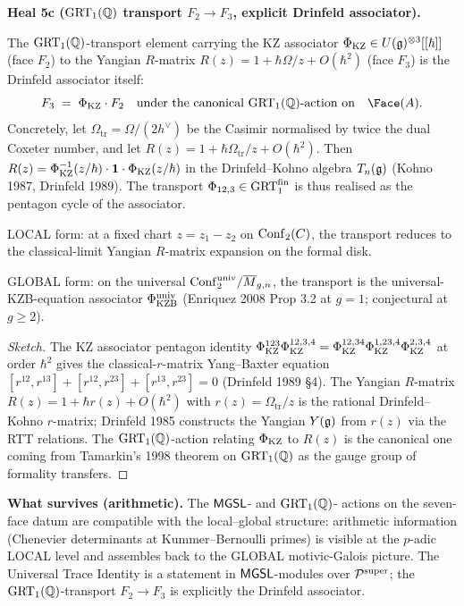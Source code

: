 \textbf{Heal 5c ($\mathrm{GRT}_1(\mathbb{Q})$ transport $F_2 \to F_3$, explicit
Drinfeld associator).}

\begin{proposition}\ClaimStatusTheorem
\label{prop:F2-F3-drinfeld-associator}
The $\mathrm{GRT}_1(\mathbb{Q})$-transport element carrying the KZ associator $\Phi_{\mathrm{KZ}}
\in U(\mathfrak{g})^{\otimes 3}[[\hbar]]$ (face $F_2$) to the Yangian
$R$-matrix $R(z) = 1 + \hbar \Omega/z + O(\hbar^2)$ (face $F_3$) is
the Drinfeld associator itself:
\[
  F_3 \;=\; \Phi_{\KZ} \cdot F_2
  \quad\text{under the canonical $\GRT(\QQ)$-action on}\quad
  \Face(A).
\]
Concretely, let $\Omega_{\mathrm{tr}} = \Omega / (2 h^\vee)$ be the
Casimir normalised by twice the dual Coxeter number, and let
$R(z) = 1 + \hbar \Omega_{\mathrm{tr}}/z + O(\hbar^2)$. Then
$R(z) = \Phi_{\mathrm{KZ}}^{-1}(z/\hbar) \cdot \mathbf{1} \cdot \Phi_{\mathrm{KZ}}(z/\hbar)$
in the Drinfeld--Kohno algebra $T_n(\mathfrak{g})$ (Kohno 1987, Drinfeld
1989). The transport $\Phi_{12,3} \in \mathrm{GRT}_1^{\mathrm{fin}}$ is thus
realised as the pentagon cycle of the associator.

LOCAL form: at a fixed chart $z = z_1 - z_2$ on $\mathrm{Conf}_2(C)$, the
transport reduces to the classical-limit Yangian $R$-matrix expansion
on the formal disk.

GLOBAL form: on the universal $\mathrm{Conf}_2^{\mathrm{univ}}/\overline{M}_{g,n}$,
the transport is the universal-KZB-equation associator $\Phi_{\mathrm{KZB}}^{\mathrm{univ}}$
(Enriquez 2008 Prop 3.2 at $g = 1$; conjectural at $g \ge 2$).
\end{proposition}

\begin{proof}[Sketch]
The KZ associator pentagon identity
$\Phi_{\mathrm{KZ}}^{123} \Phi_{\mathrm{KZ}}^{12,3,4} = \Phi_{\mathrm{KZ}}^{12,34} \Phi_{\mathrm{KZ}}^{1,23,4} \Phi_{\mathrm{KZ}}^{2,3,4}$
at order $\hbar^2$ gives the classical-$r$-matrix Yang--Baxter
equation $[r^{12}, r^{13}] + [r^{12}, r^{23}] + [r^{13}, r^{23}] = 0$
(Drinfeld 1989 §4). The Yangian $R$-matrix $R(z) = 1 + \hbar r(z) +
O(\hbar^2)$ with $r(z) = \Omega_{\mathrm{tr}}/z$ is the rational
Drinfeld--Kohno $r$-matrix; Drinfeld 1985 constructs the Yangian
$Y(\mathfrak{g})$ from $r(z)$ via the RTT relations. The $\mathrm{GRT}_1(\mathbb{Q})$-action
relating $\Phi_{\mathrm{KZ}}$ to $R(z)$ is the canonical one coming from
Tamarkin's 1998 theorem on $\mathrm{GRT}_1(\mathbb{Q})$ as the gauge group of
formality transfers.
\end{proof}

\textbf{What survives (arithmetic).} The $\mathsf{MGSL}$- and $\mathrm{GRT}_1(\mathbb{Q})$-
actions on the seven-face datum are compatible with the local--global
structure: arithmetic information (Chenevier determinants at
Kummer--Bernoulli primes) is visible at the $p$-adic LOCAL level and
assembles back to the GLOBAL motivic-Galois picture. The Universal
Trace Identity is a statement in $\mathsf{MGSL}$-modules over
$\mathcal{P}^{\mathrm{super}}$; the $\mathrm{GRT}_1(\mathbb{Q})$-transport $F_2 \to F_3$ is
explicitly the Drinfeld associator.

